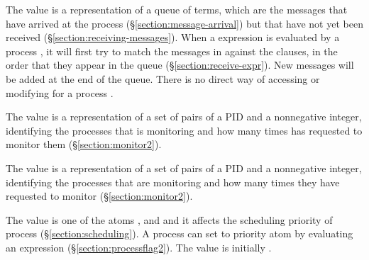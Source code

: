 \begin{Lentry}
\item[\T{message_queue[\Z{P}]}]
The value is a representation of a queue of terms, which are the
messages that have arrived at the process
(\S\ref{section:message-arrival}) but that have not yet been received
(\S\ref{section:receiving-messages}).  When a  expression
is evaluated by a process , it will first try to match the
messages in  against the clauses, in the order
that they appear in the queue (\S\ref{section:receive-expr}).  New
messages will be added at the end of the queue.  There is no direct way
of accessing or modifying  for a process
.

\ifNew
\item[\T{monitored_processes[\Z{P}]}]
The value is a representation of a set of pairs of a PID and a nonnegative integer,
identifying the processes that  is monitoring and how many times  has requested
to monitor them (\S\ref{section:monitor2}).

\item[\T{monitoring_processes[\Z{P}]}]
The value is a representation of a set of pairs of a PID and a nonnegative integer,
identifying the processes that are monitoring  and how many times they have requested
to monitor  (\S\ref{section:monitor2}).
\fi

\item[\T{priority[\Z{P}]}]
The value is one of the atoms ,
 and
 and it affects the
scheduling priority of process  (\S\ref{section:scheduling}).
A process  can set  to priority atom
 by evaluating an expression
 (\S\ref{section:processflag2}).
The value is initially .


\end{Lentry}
